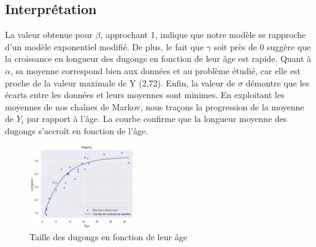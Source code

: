 \documentclass{rapportECN}
\begin{document}
\subsection*{Interprétation}

La valeur obtenue pour $\beta$, approchant 1, indique que notre modèle se rapproche d'un modèle exponentiel modifié. De plus, le fait que $\gamma$ soit près de 0 suggère que la croissance en longueur des dugongs en fonction de leur âge est rapide. Quant à $\alpha$, sa moyenne correspond bien aux données et au problème étudié, car elle est proche de la valeur maximale de Y (2,72). Enfin, la valeur de $\sigma$ démontre que les écarts entre les données et leurs moyennes sont minimes. En exploitant les moyennes de nos chaînes de Markov, nous traçons la progression de la moyenne de $Y_i$ par rapport à l'âge. La courbe confirme que la longueur moyenne des dugongs s'accroît en fonction de l'âge.
\begin{figure}[H]
\centering
\includegraphics[width=0.4\textwidth]{logos/ev2.png}
\caption{Taille des dugongs en fonction de leur âge}
    
\end{figure}
\end{document}
